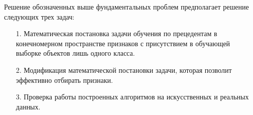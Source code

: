 \documentclass[12pt]{article}
\begin{document}
	Решение обозначенных выше фундаментальных проблем предполагает решение следующих трех задач:
	\begin{enumerate}
		\item[1.] Математическая постановка задачи обучения по прецедентам в конечномерном пространстве признаков с присутствием в обучающей выборке объектов лишь одного класса.
		\item[2.] Модификация математической постановки задачи, которая позволит эффективно отбирать признаки.
		\item[3.] Проверка работы построенных алгоритмов на искусственных и реальных данных.
	\end{enumerate}
\end{document}
